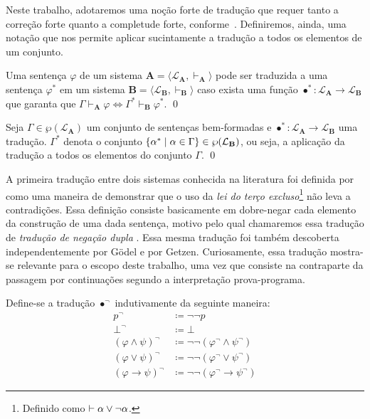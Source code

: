 Neste trabalho, adotaremos uma noção forte de tradução que requer tanto a correção forte quanto a completude forte, conforme~\cite{Coniglio}. Definiremos, ainda, uma notação que nos permite aplicar sucintamente a tradução a todos os elementos de um conjunto.

\begin{definition}[Tradução] 
    Uma sentença $\varphi$ de um sistema $\mathbf{A} = \langle \mathcal{L}_\mathbf{A}, \vdash_\mathbf{A}\rangle$ pode ser traduzida a uma sentença $\varphi^*$ em um sistema $\mathbf{B} = \langle \mathcal{L}_\mathbf{B}, \vdash_\mathbf{B} \rangle$ caso exista uma função $\bullet^* : \mathcal{L}_\mathbf{A} \to \mathcal{L}_\mathbf{B}$ que garanta que $\Gamma \vdash_\mathbf{A} \varphi \Leftrightarrow \Gamma^* \vdash_\mathbf{B} \varphi^*$.
    \qed{}
\end{definition}

\begin{notation}
    Seja $\Gamma\in\wp(\mathcal{L}_\mathbf{A})$ um conjunto de sentenças bem-formadas e $\bullet^*\mathrel{:}\mathcal{L}_\mathbf{A}\to\mathcal{L}_\mathbf{B}$ uma tradução. $\Gamma^*$ denota o conjunto $\left\{\alpha^*\mid\alpha\in\Gamma\right\}\in\wp(\mathcal{L}_\mathbf{B})$, ou seja, a aplicação da tradução a todos os elementos do conjunto $\Gamma$.
    \qed{}
\end{notation}

A primeira tradução entre dois sistemas conhecida na literatura foi definida por~\cite{Kolmogorov} como uma maneira de demonstrar que o uso da \emph{lei do terço excluso}\footnote{Definido como $\mathrel{\vdash}\alpha\vee\neg\alpha$.} não leva a contradições. Essa definição consiste basicamente em dobre-negar cada elemento da construção de uma dada sentença, motivo pelo qual chamaremos essa tradução de \emph{tradução de negação dupla} \citep{Coniglio}. Essa mesma tradução foi também descoberta independentemente por Gödel e por Getzen. Curiosamente, essa tradução mostra-se relevante para o escopo deste trabalho, uma vez que consiste na contraparte da passagem por continuações segundo a interpretação prova-programa.

\begin{definition}[$\bullet^\neg$] Define-se a tradução $\bullet^\neg$ indutivamente da seguinte maneira:
    \begin{align*}
        p^\neg&\coloneqq\neg\neg p\\
        \bot^\neg&\coloneqq\bot\\
        {(\varphi\wedge\psi)}^\neg&\coloneqq\neg\neg(\varphi^\neg \wedge \psi^\neg)\\
        {(\varphi\vee\psi)}^\neg&\coloneqq\neg\neg (\varphi^\neg \vee \psi^\neg)\\
        {(\varphi\to\psi)}^\neg&\coloneqq\neg\neg (\varphi^\neg \to \psi^\neg)
        \tag*{\qed} 
    \end{align*}
\end{definition}

